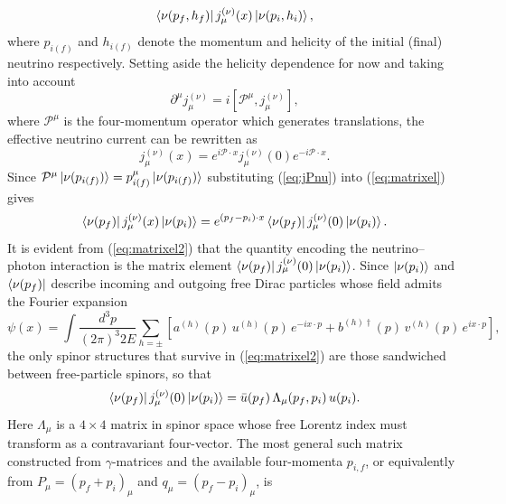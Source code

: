 \begin{equation}\label{eq:matrixel}
	\bra{\nu(p_f,h_f)}j^{(\nu)}_{\mu}(x)\ket{\nu(p_i,h_i)},
\end{equation}
where $p_{i(f)}$ and $h_{i(f)}$ denote the momentum and helicity of the initial (final) neutrino respectively. Setting aside the helicity dependence for now and taking into account
\begin{equation}\label{eq:canonicalderivative}
	\partial^\mu j^{(\nu)}_\mu = i \left[ \mathcal{P}^\mu, j^{(\nu)}_\mu\right],
\end{equation}
where $\mathcal{P}^\mu$ is the four-momentum operator which generates translations, the effective neutrino current can be rewritten as
\begin{equation}\label{eq:jPnu}
	j^{(\nu)}_\mu(x) = e^{i\mathcal{P}\cdot x}j^{(\nu)}_\mu(0)e^{-i\mathcal{P}\cdot x}.
\end{equation}
Since $\mathcal{P}^\mu \ket{\nu(p_{i(f)})} = p_{i(f)}^\mu \ket{\nu(p_{i(f)})}$ substituting (\ref{eq:jPnu}) into (\ref{eq:matrixel}) gives
\begin{equation}\label{eq:matrixel2}
	\bra{\nu(p_f)}j^{(\nu)}_{\mu}(x)\ket{\nu(p_i)} = e^{(p_f - p_i)\cdot x}\bra{\nu(p_f)}j^{(\nu)}_{\mu}(0)\ket{\nu(p_i)}.
\end{equation}
It is evident from (\ref{eq:matrixel2}) that the quantity encoding the neutrino--photon interaction is the matrix element $\bra{\nu(p_f)}j^{(\nu)}_{\mu}(0)\ket{\nu(p_i)}$. Since $\ket{\nu(p_i)}$ and $\bra{\nu(p_f)}$ describe incoming and outgoing free Dirac particles whose field admits the Fourier expansion
%
\begin{equation}
\psi(x) = \int \frac{d^3p}{(2\pi)^3 2E}\sum_{h=\pm}
\left[ a^{(h)}(p)\,u^{(h)}(p)\,e^{-ix\cdot p}
   + b^{(h)\dagger}(p)\,v^{(h)}(p)\,e^{ix\cdot p}\right],
\end{equation}
%
the only spinor structures that survive in (\ref{eq:matrixel2}) are those sandwiched between free-particle spinors, so that
%
\begin{equation}\label{eq:matrixelem}
\bra{\nu(p_f)}j^{(\nu)}_{\mu}(0)\ket{\nu(p_i)}
= \bar{u}(p_f)\,\Lambda_\mu(p_f,p_i)\,u(p_i).
\end{equation}
%
Here $\Lambda_\mu$ is a $4\times 4$ matrix in spinor space whose free Lorentz index must transform as a contravariant four-vector. The most general such matrix constructed from $\gamma$-matrices and the available four-momenta $p_{i,f}$, or equivalently from $P_\mu = (p_f+p_i)_\mu$ and $q_\mu = (p_f - p_i)_\mu$, is~\cite{Nowakowski_2005}
